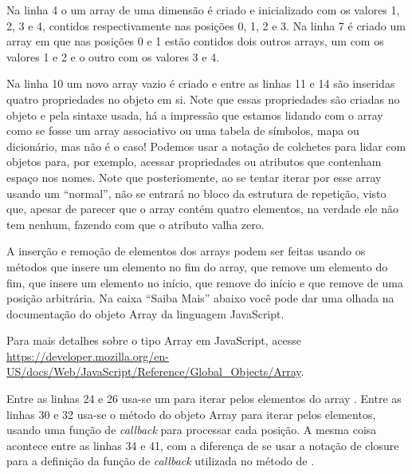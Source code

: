 Na linha 4 o um array de uma dimensão é criado e inicializado com os valores 1, 2, 3 e 4, contidos respectivamente nas posições 0, 1, 2 e 3. Na linha 7 é criado um array em que nas posições 0 e 1 estão contidos dois outros arrays, um com os valores 1 e 2 e o outro com os valores 3 e 4.

Na linha 10 um novo array vazio é criado e entre as linhas 11 e 14 são inseridas quatro propriedades no objeto em si. Note que essas propriedades são criadas no objeto e pela sintaxe usada, há a impressão que estamos lidando com o array como se fosse um array associativo ou uma tabela de símbolos, mapa ou dicionário, mas não é o caso! Podemos usar a notação de colchetes para lidar com objetos para, por exemplo, acessar propriedades ou atributos que contenham espaço nos nomes. Note que posteriomente, ao se tentar iterar por esse array usando um  ``normal'', não se entrará no bloco da estrutura de repetição, visto que, apesar de parecer que o array contém quatro elementos, na verdade ele não tem nenhum, fazendo com que o atributo  valha zero.

A inserção e remoção de elementos dos arrays podem ser feitas usando os métodos  que insere um elemento no fim do array,  que remove um elemento do fim,  que insere um elemento no início,  que remove do início e  que remove de uma posição arbitrária. Na caixa ``Saiba Mais'' abaixo você pode dar uma olhada na documentação do objeto Array da linguagem JavaScript.

\begin{saibaMais}
    Para mais detalhes sobre o tipo Array em JavaScript, acesse \url{https://developer.mozilla.org/en-US/docs/Web/JavaScript/Reference/Global_Objects/Array}.
\end{saibaMais}

Entre as linhas 24 e 26 usa-se um  para iterar pelos elementos do array . Entre as linhas 30 e 32 usa-se o método  do objeto Array para iterar pelos elementos, usando uma função de \textit{callback} para processar cada posição. A mesma coisa acontece entre as linhas 34 e 41, com a diferença de se usar a notação de closure para a definição da função de \textit{callback} utilizada no método  de .

